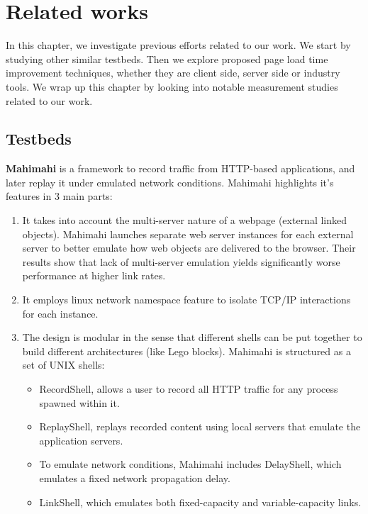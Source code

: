 \chapter{Related works}\label{ch:relatedworks}
In this chapter, we investigate previous efforts related to our work.
We start by studying other similar testbeds. Then we  explore proposed page load time improvement techniques, whether they are client side, server side or industry tools. We wrap up this chapter by looking into notable measurement studies related to our work.
\section{Testbeds}
\textbf{Mahimahi} \cite{mahimahi} is a framework to record traffic from HTTP-based applications, and later replay it under emulated network conditions. Mahimahi highlights it's features in  3 main parts:
\begin{enumerate}

\item It takes into account the multi-server nature of a webpage (external linked objects). Mahimahi launches separate web server instances for each external server to better emulate how web objects are delivered to the browser. Their results show that lack of multi-server emulation yields significantly worse performance at higher link rates.

\item It employs linux network namespace feature to isolate TCP/IP interactions for each instance.

\item The design is modular in the sense that different shells can be put together to build different architectures (like Lego blocks). Mahimahi is structured as a set of UNIX shells: 
\begin{itemize}
\item RecordShell, allows a user to record all HTTP traffic for any process spawned within it.
\item ReplayShell, replays recorded content using local servers that emulate the application servers.
\item To emulate network conditions, Mahimahi includes DelayShell, which emulates a fixed network propagation delay. 
\item  LinkShell, which emulates both fixed-capacity and variable-capacity links.
\end{itemize}
\end{enumerate}

